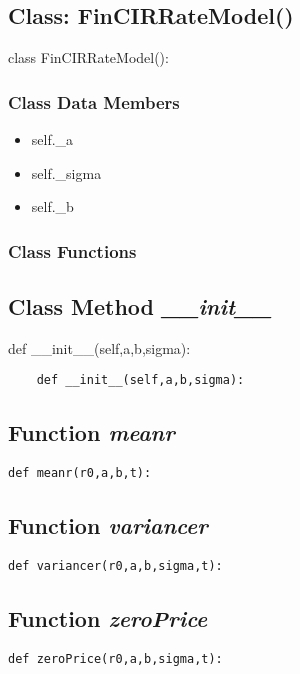 \documentclass[twoside,11pt]{book}
\begin{document}
\subsection{Class: FinCIRRateModel()}
class FinCIRRateModel():

\subsubsection{Class Data Members}
\begin{itemize}
\item{self.\_a}
\item{self.\_sigma}
\item{self.\_b}
\end{itemize}

\subsubsection{Class Functions}

\subsection{Class Method {\it \_\_init\_\_}}
def \_\_init\_\_(self,a,b,sigma):

\begin{lstlisting}
    def __init__(self,a,b,sigma):
\end{lstlisting}

\subsection{Function {\it meanr}}


\begin{lstlisting}
def meanr(r0,a,b,t):
\end{lstlisting}

\subsection{Function {\it variancer}}


\begin{lstlisting}
def variancer(r0,a,b,sigma,t):
\end{lstlisting}

\subsection{Function {\it zeroPrice}}


\begin{lstlisting}
def zeroPrice(r0,a,b,sigma,t):
\end{lstlisting}
\end{document}
